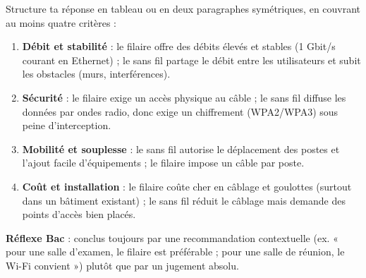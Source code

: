 \documentclass[11pt]{article}
\begin{document}
\begin{methode}
Structure ta réponse en tableau ou en deux paragraphes symétriques, en couvrant au moins quatre critères :
\begin{enumerate}
\item \textbf{Débit et stabilité} : le filaire offre des débits élevés et stables (1 Gbit/s courant en Ethernet) ; le sans fil partage le débit entre les utilisateurs et subit les obstacles (murs, interférences).
\item \textbf{Sécurité} : le filaire exige un accès physique au câble ; le sans fil diffuse les données par ondes radio, donc exige un chiffrement (WPA2/WPA3) sous peine d'interception.
\item \textbf{Mobilité et souplesse} : le sans fil autorise le déplacement des postes et l'ajout facile d'équipements ; le filaire impose un câble par poste.
\item \textbf{Coût et installation} : le filaire coûte cher en câblage et goulottes (surtout dans un bâtiment existant) ; le sans fil réduit le câblage mais demande des points d'accès bien placés.
\end{enumerate}
\textbf{Réflexe Bac} : conclus toujours par une recommandation contextuelle (ex. « pour une salle d'examen, le filaire est préférable ; pour une salle de réunion, le Wi-Fi convient ») plutôt que par un jugement absolu.
\end{methode}
\end{document}
